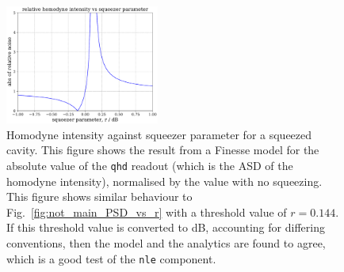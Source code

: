\documentclass[aps,pra,superscriptaddress,reprint,nofootinbib]{revtex4-1}
\newcommand{\code}[1]{\texttt{#1}}
\begin{document}
\begin{figure}[ht]
	\begin{center}
	\includegraphics[width=0.45\textwidth]{figures/pykat_relative_qhd_vs_r.pdf}
	\end{center}
	\caption{Homodyne intensity against squeezer parameter for a squeezed cavity. This figure shows the result from a Finesse model for the absolute value of the \code{qhd} readout (which is the ASD of the homodyne intensity), normalised by the value with no squeezing. This figure shows similar behaviour to Fig.~\ref{fig:not_main_PSD_vs_r} with a threshold value of $r = 0.144$. If this threshold value is converted to dB, accounting for differing conventions, then the model and the analytics are found to agree, which is a good test of the \code{nle} component.}
	\label{fig:pykat_relative_qhd_vs_r}
\end{figure}
\end{document}
